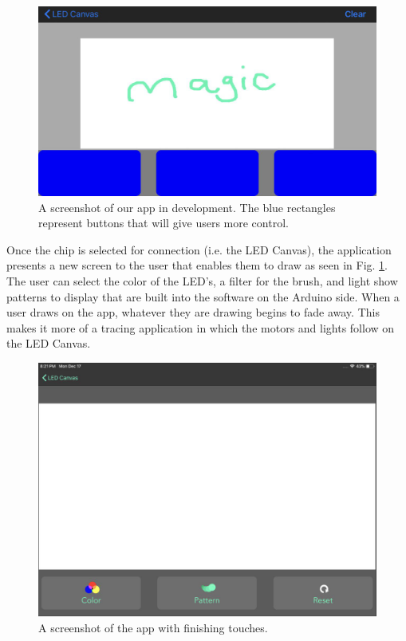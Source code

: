 \documentclass[11pt]{IEEEtran}
\begin{document}
\begin{figure}[H]
  \centering
  \includegraphics[width=\columnwidth]{image3.png}
  \caption{A screenshot of our app in development. The blue rectangles represent buttons that will give users more control.}
  \label{fig:iosapp}
\end{figure}

Once the chip is selected for connection (i.e. the LED Canvas), the application presents a new screen to the user that enables them to draw as seen in Fig. \ref{fig:iosapp}. The user can select the color of the LED’s, a filter for the brush, and light show patterns to display that are built into the software on the Arduino side. When a user draws on the app, whatever they are drawing begins to fade away. This makes it more of a tracing application in which the motors and lights follow on the LED Canvas.

\begin{figure}[H]
  \centering
  \includegraphics[width=\columnwidth]{ios_app_updated.jpg}
  \caption{A screenshot of the app with finishing touches.}
  \label{fig:iosappupdate}
\end{figure}
\end{document}
